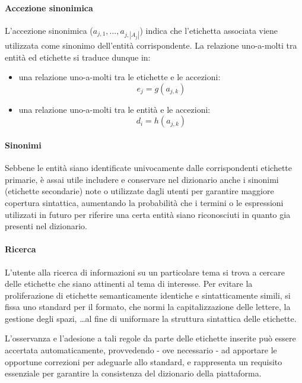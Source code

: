 \paragraph{Accezione sinonimica}
L'accezione sinonimica ($a_{j,1},\ldots,a_{j,\left|A_j\right|}$) indica che l'etichetta associata viene utilizzata come sinonimo dell'entità corrispondente. La relazione uno-a-molti tra entità ed etichette si traduce dunque in:
\begin{itemize}
\item una relazione uno-a-molti tra le etichette e le accezioni:
\begin{equation}
e_j = g(a_{j,k})
\end{equation}
\item una relazione uno-a-molti tra le entità e le accezioni:
\begin{equation}
d_i = h(a_{j,k})
\end{equation}
\end{itemize}

\paragraph{Sinonimi}
Sebbene le entità siano identificate univocamente dalle corrispondenti etichette primarie, è assai utile includere e conservare nel dizionario anche i sinonimi (etichette secondarie) note o utilizzate dagli utenti per garantire maggiore copertura sintattica, aumentando la probabilità che i termini o le espressioni utilizzati in futuro per riferire una certa entità siano riconosciuti in quanto gia presenti nel dizionario.

\paragraph{Ricerca}
L'utente alla ricerca di informazioni su un particolare tema si trova a cercare delle etichette che siano attinenti al tema di interesse. Per evitare la proliferazione di etichette semanticamente identiche e sintatticamente simili, si fissa uno standard per il formato, che normi la capitalizzazione delle lettere, la gestione degli spazi, \ldots al fine di uniformare la struttura sintattica delle etichette.

L’osservanza e l’adesione a tali regole da parte delle etichette inserite può essere accertata automaticamente, provvedendo - ove necessario - ad apportare le opportune correzioni per adeguarle allo standard, e rappresenta un requisito essenziale per garantire la consistenza del dizionario della piattaforma.

